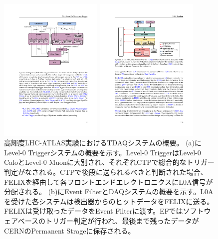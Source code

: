 \begin{figure}
\begin{minipage}[b]{.5\linewidth}
\centering
\includegraphics[height=7cm]{fig/Intro/Phase2_L0trigger.pdf}
\end{minipage}%
\begin{minipage}[b]{.5\linewidth}
\centering
\includegraphics[height=7cm]{fig/Intro/Phase2_EF.pdf}
\end{minipage}%
\caption[高輝度LHC-ATLAS実験におけるTDAQシステムの概要]{高輝度LHC-ATLAS実験におけるTDAQシステムの概要\cite{tdr_phase2tdaq_2017020}。 (a)にLevel-0 Triggerシステムの概要を示す。Level-0 TriggerはLevel-0 CaloとLevel-0 Muonに大別され、それぞれCTPで総合的なトリガー判定がなされる。CTPで後段に送られるべきと判断された場合、FELIXを経由して各フロントエンドエレクトロニクスにL0A信号が分配される。 (b)にEvent FilterとDAQシステムの概要を示す。L0Aを受けた各システムは検出器からのヒットデータをFELIXに送る。FELIXは受け取ったデータをEvent Filterに渡す。EFではソフトウェアベースのトリガー判定が行われ、最後まで残ったデータがCERNのPermanent Strageに保存される。}
\label{Phase2_TDAQ}
\end{figure}

